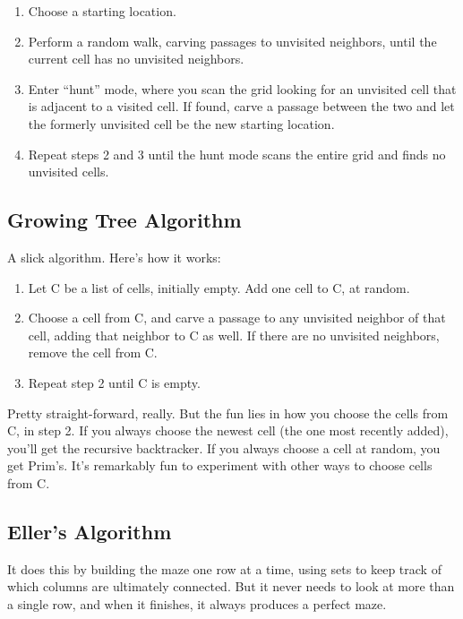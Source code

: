 \documentclass{article}
\begin{document}
{\begin{enumerate}
    \item Choose a starting location.
    \item Perform a random walk, carving passages to unvisited neighbors, until the current cell has no unvisited neighbors.
    \item Enter “hunt” mode, where you scan the grid looking for an unvisited cell that is adjacent to a visited cell. If found, carve a passage between the two and let the formerly unvisited cell be the new starting location.
    \item Repeat steps 2 and 3 until the hunt mode scans the entire grid and finds no unvisited cells.
\end{enumerate}

\subsection{Growing Tree Algorithm}
A slick algorithm. Here's how it works:

\begin{enumerate}
    \item Let C be a list of cells, initially empty. Add one cell to C, at random.
    \item Choose a cell from C, and carve a passage to any unvisited neighbor of that cell, adding that neighbor to C as well. If there are no unvisited neighbors, remove the cell from C.
    \item Repeat step 2 until C is empty.
\end{enumerate}

Pretty straight-forward, really. But the fun lies in how you choose the cells from C, in step 2. If you always choose the newest cell (the one most recently added), you'll get the recursive backtracker. If you always choose a cell at random, you get Prim's. It's remarkably fun to experiment with other ways to choose cells from C.

\subsection{Eller's Algorithm}
It does this by building the maze one row at a time, using sets to keep track of which columns are ultimately connected. But it never needs to look at more than a single row, and when it finishes, it always produces a perfect maze.

}
\end{document}
